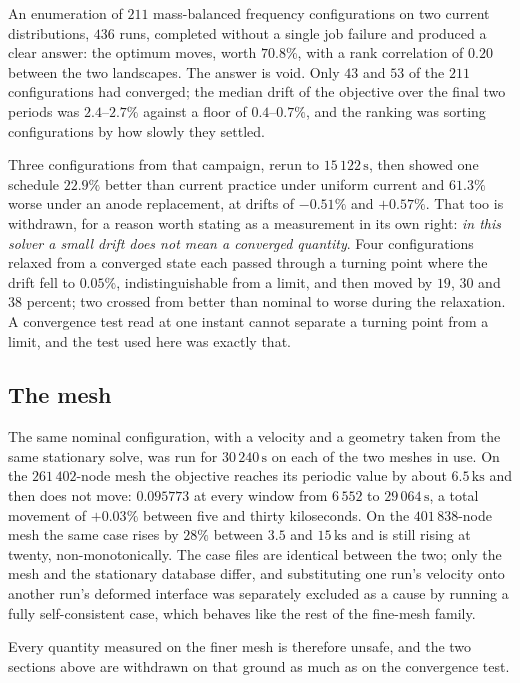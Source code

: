 \documentclass[11pt,a4paper]{article}
\theoremstyle{plain}
\theoremstyle{definition}
\theoremstyle{remark}
\begin{document}
An enumeration of $211$ mass-balanced frequency configurations on two current
distributions, $436$ runs, completed without a single job failure and produced a
clear answer: the optimum moves, worth $70.8\%$, with a rank correlation of
$0.20$ between the two landscapes. The answer is void. Only $43$ and $53$ of the
$211$ configurations had converged; the median drift of the objective over the
final two periods was $2.4$--$2.7\%$ against a floor of $0.4$--$0.7\%$, and the
ranking was sorting configurations by how slowly they settled.

Three configurations from that campaign, rerun to $15\,122\,\mathrm{s}$, then
showed one schedule $22.9\%$ better than current practice under uniform current
and $61.3\%$ worse under an anode replacement, at drifts of $-0.51\%$ and
$+0.57\%$. That too is withdrawn, for a reason worth stating as a measurement in
its own right: \emph{in this solver a small drift does not mean a converged
quantity}. Four configurations relaxed from a converged state each passed through
a turning point where the drift fell to $0.05\%$, indistinguishable from a limit,
and then moved by $19$, $30$ and $38$ percent; two crossed from better than
nominal to worse during the relaxation. A convergence test read at one instant
cannot separate a turning point from a limit, and the test used here was exactly
that.

\subsection{The mesh}
\label{sec:feeding-mesh}

The same nominal configuration, with a velocity and a geometry taken from the
same stationary solve, was run for $30\,240\,\mathrm{s}$ on each of the two
meshes in use. On the $261\,402$-node mesh the objective reaches its periodic
value by about $6.5\,\mathrm{ks}$ and then does not move: $0.095773$ at every
window from $6\,552$ to $29\,064\,\mathrm{s}$, a total movement of $+0.03\%$
between five and thirty kiloseconds. On the $401\,838$-node mesh the same case
rises by $28\%$ between $3.5$ and $15\,\mathrm{ks}$ and is still rising at
twenty, non-monotonically. The case files are identical between the two; only the
mesh and the stationary database differ, and substituting one run's velocity onto
another run's deformed interface was separately excluded as a cause by running a
fully self-consistent case, which behaves like the rest of the fine-mesh family.

Every quantity measured on the finer mesh is therefore unsafe, and the two
sections above are withdrawn on that ground as much as on the convergence test.
\end{document}
